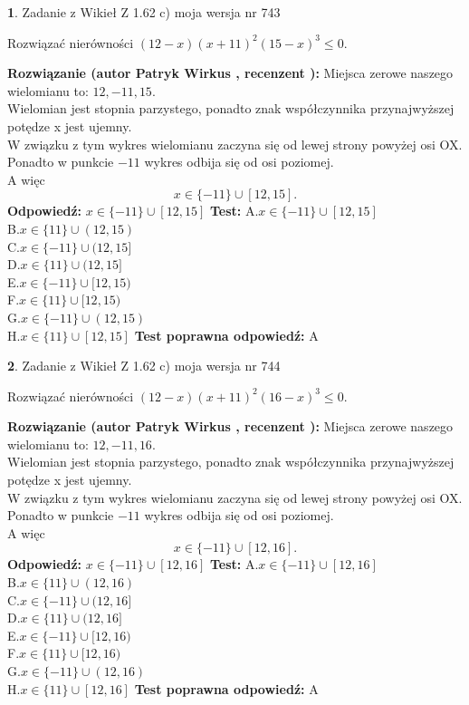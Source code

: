 \documentclass[12pt, a4paper]{article}
\theoremstyle{definition} %
\newtheorem{zad}{}
\newcommand{\zadStart}[1]{\begin{zad}#1\newline}
\newcommand{\zadStop}{\end{zad}}
\newcommand{\rozwStart}[2]{\noindent \textbf{Rozwiązanie (autor #1 , recenzent #2): }\newline}
\newcommand{\rozwStop}{\newline}
\newcommand{\odpStart}{\noindent \textbf{Odpowiedź:}\newline}
\newcommand{\odpStop}{\newline}
\newcommand{\testStart}{\noindent \textbf{Test:}\newline}
\newcommand{\testStop}{\newline}
\newcommand{\kluczStart}{\noindent \textbf{Test poprawna odpowiedź:}\newline}
\newcommand{\kluczStop}{\newline}
\begin{document}
\zadStart{Zadanie z Wikieł Z 1.62 c) moja wersja nr 743}

Rozwiązać nierówności $(12-x)(x+11)^{2}(15-x)^{3}\le0$.
\zadStop
\rozwStart{Patryk Wirkus}{}
Miejsca zerowe naszego wielomianu to: $12, -11, 15$.\\
Wielomian jest stopnia parzystego, ponadto znak współczynnika przy\linebreak najwyższej potędze x jest ujemny.\\ W związku z tym wykres wielomianu zaczyna się od lewej strony powyżej osi OX.\\
Ponadto w punkcie $-11$ wykres odbija się od osi poziomej.\\
A więc $$x \in \{-11\} \cup [12,15].$$
\rozwStop
\odpStart
$x \in \{-11\} \cup [12,15]$
\odpStop
\testStart
A.$x \in \{-11\} \cup [12,15]$\\
B.$x \in \{11\} \cup (12,15)$\\
C.$x \in \{-11\} \cup (12,15]$\\
D.$x \in \{11\} \cup (12,15]$\\
E.$x \in \{-11\} \cup [12,15)$\\
F.$x \in \{11\} \cup [12,15)$\\
G.$x \in \{-11\} \cup (12,15)$\\
H.$x \in \{11\} \cup [12,15]$
\testStop
\kluczStart
A
\kluczStop



\zadStart{Zadanie z Wikieł Z 1.62 c) moja wersja nr 744}

Rozwiązać nierówności $(12-x)(x+11)^{2}(16-x)^{3}\le0$.
\zadStop
\rozwStart{Patryk Wirkus}{}
Miejsca zerowe naszego wielomianu to: $12, -11, 16$.\\
Wielomian jest stopnia parzystego, ponadto znak współczynnika przy\linebreak najwyższej potędze x jest ujemny.\\ W związku z tym wykres wielomianu zaczyna się od lewej strony powyżej osi OX.\\
Ponadto w punkcie $-11$ wykres odbija się od osi poziomej.\\
A więc $$x \in \{-11\} \cup [12,16].$$
\rozwStop
\odpStart
$x \in \{-11\} \cup [12,16]$
\odpStop
\testStart
A.$x \in \{-11\} \cup [12,16]$\\
B.$x \in \{11\} \cup (12,16)$\\
C.$x \in \{-11\} \cup (12,16]$\\
D.$x \in \{11\} \cup (12,16]$\\
E.$x \in \{-11\} \cup [12,16)$\\
F.$x \in \{11\} \cup [12,16)$\\
G.$x \in \{-11\} \cup (12,16)$\\
H.$x \in \{11\} \cup [12,16]$
\testStop
\kluczStart
A
\kluczStop
\end{document}
